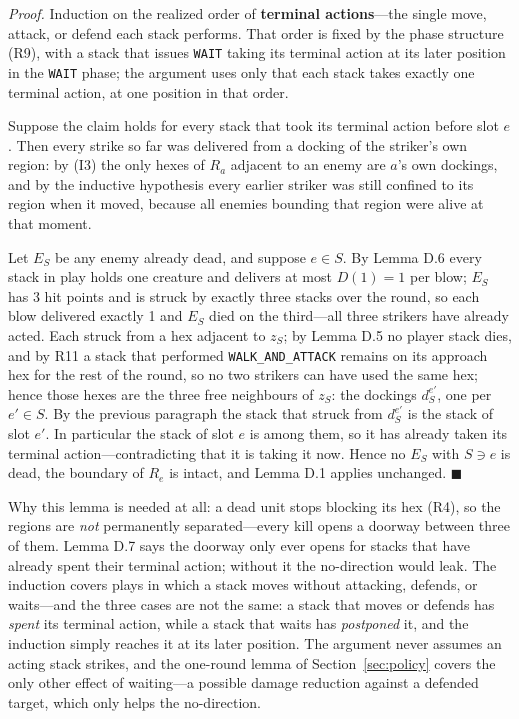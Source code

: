 \documentclass[11pt,a4paper]{article}
\theoremstyle{plain}
\theoremstyle{definition}
\theoremstyle{plain}
\theoremstyle{definition}
\theoremstyle{remark}
\newcommand{\qedbox}{\hfill$\blacksquare$}
\begin{document}
\noindent\emph{Proof.} Induction on the realized order of \textbf{terminal actions}---the single
move, attack, or defend each stack performs. That order is fixed by the phase structure (R9),
with a stack that issues \texttt{WAIT} taking its terminal action at its later position in the
\texttt{WAIT} phase; the argument uses only that each stack takes exactly one terminal action, at
one position in that order.

Suppose the claim holds for every stack that took its terminal action before slot $e$. Then every
strike so far was delivered from a docking of the striker's own region: by (I3) the only hexes of
$R_a$ adjacent to an enemy are $a$'s own dockings, and by the inductive hypothesis every earlier
striker was still confined to its region when it moved, because all enemies bounding that region
were alive at that moment.

Let $E_S$ be any enemy already dead, and suppose $e\in S$. By Lemma D.6 every stack in play holds
one creature and delivers at most $D(1)=1$ per blow; $E_S$ has 3 hit points and is struck by
exactly three stacks over the round, so each blow delivered exactly 1 and $E_S$ died on the
third---all three strikers have already acted. Each struck from a hex adjacent to $z_S$; by
Lemma D.5 no player stack dies, and by R11 a stack that performed \texttt{WALK\_AND\_ATTACK}
remains on its approach hex for the rest of the round, so no two strikers can have used the same
hex; hence those hexes are the three free neighbours of $z_S$: the dockings
$d_S^{e'}$, one per $e'\in S$. By the previous paragraph the stack that struck from $d_S^{e'}$ is
the stack of slot $e'$. In particular the stack of slot $e$ is among them, so it has already
taken its terminal action---contradicting that it is taking it now. Hence no $E_S$ with $S\ni e$
is dead, the boundary of $R_e$ is intact, and Lemma D.1 applies unchanged. \qedbox

\smallskip
Why this lemma is needed at all: a dead unit stops blocking its hex (R4), so the regions are
\emph{not} permanently separated---every kill opens a doorway between three of them. Lemma D.7
says the doorway only ever opens for stacks that have already spent their terminal action;
without it the no-direction would leak. The induction covers plays in which a stack moves without
attacking, defends, or waits---and the three cases are not the same: a stack that moves or
defends has \emph{spent} its terminal action, while a stack that waits has \emph{postponed} it,
and the induction simply reaches it at its later position. The argument never assumes an acting
stack strikes, and the one-round lemma of Section~\ref{sec:policy} covers the only other effect
of waiting---a possible damage reduction against a defended target, which only helps the
no-direction.
\end{document}
